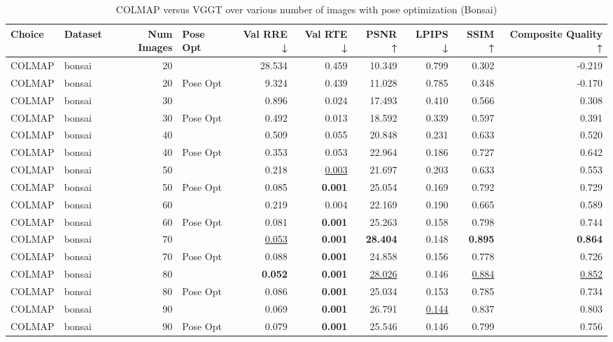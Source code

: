 \begin{table}[H]
\caption{\ifdefined\customcaption \customcaption \else COLMAP versus VGGT over various number of images with pose optimization (Bonsai) \fi}
\label{tab:01_num_images_pose_opt_bonsai}
\centering
\tiny
\begin{tabular}{llrlrrrrrr}
\toprule
Choice & Dataset & Num Images & Pose Opt & Val RRE ↓ & Val RTE ↓ & PSNR ↑ & LPIPS ↓ & SSIM ↑ & Composite Quality ↑ \\
\midrule
COLMAP & bonsai & 20 &  & 28.534 & 0.459 & 10.349 & 0.799 & 0.302 & -0.219 \\
COLMAP & bonsai & 20 & Pose Opt & 9.324 & 0.439 & 11.028 & 0.785 & 0.348 & -0.170 \\
COLMAP & bonsai & 30 &  & 0.896 & 0.024 & 17.493 & 0.410 & 0.566 & 0.308 \\
COLMAP & bonsai & 30 & Pose Opt & 0.492 & 0.013 & 18.592 & 0.339 & 0.597 & 0.391 \\
COLMAP & bonsai & 40 &  & 0.509 & 0.055 & 20.848 & 0.231 & 0.633 & 0.520 \\
COLMAP & bonsai & 40 & Pose Opt & 0.353 & 0.053 & 22.964 & 0.186 & 0.727 & 0.642 \\
COLMAP & bonsai & 50 &  & 0.218 & \underline{0.003} & 21.697 & 0.203 & 0.633 & 0.553 \\
COLMAP & bonsai & 50 & Pose Opt & 0.085 & \textbf{0.001} & 25.054 & 0.169 & 0.792 & 0.729 \\
COLMAP & bonsai & 60 &  & 0.219 & 0.004 & 22.169 & 0.190 & 0.665 & 0.589 \\
COLMAP & bonsai & 60 & Pose Opt & 0.081 & \textbf{0.001} & 25.263 & 0.158 & 0.798 & 0.744 \\
COLMAP & bonsai & 70 &  & \underline{0.053} & \textbf{0.001} & \textbf{28.404} & 0.148 & \textbf{0.895} & \textbf{0.864} \\
COLMAP & bonsai & 70 & Pose Opt & 0.088 & \textbf{0.001} & 24.858 & 0.156 & 0.778 & 0.726 \\
COLMAP & bonsai & 80 &  & \textbf{0.052} & \textbf{0.001} & \underline{28.026} & 0.146 & \underline{0.884} & \underline{0.852} \\
COLMAP & bonsai & 80 & Pose Opt & 0.086 & \textbf{0.001} & 25.034 & 0.153 & 0.785 & 0.734 \\
COLMAP & bonsai & 90 &  & 0.069 & \textbf{0.001} & 26.791 & \underline{0.144} & 0.837 & 0.803 \\
COLMAP & bonsai & 90 & Pose Opt & 0.079 & \textbf{0.001} & 25.546 & 0.146 & 0.799 & 0.756 \\

\end{tabular}
\end{table}

